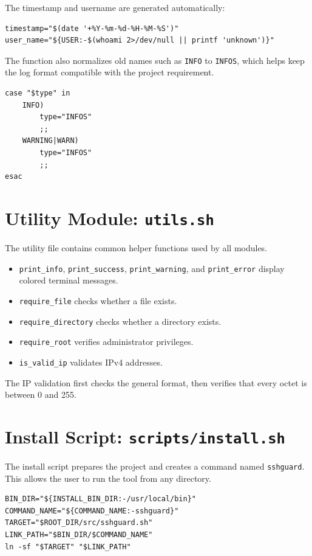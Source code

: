 \documentclass[12pt,a4paper]{article}
\begin{document}
The timestamp and username are generated automatically:

\begin{lstlisting}[style=bashstyle]
timestamp="$(date '+%Y-%m-%d-%H-%M-%S')"
user_name="${USER:-$(whoami 2>/dev/null || printf 'unknown')}"
\end{lstlisting}

The function also normalizes old names such as \texttt{INFO} to \texttt{INFOS}, which helps keep
the log format compatible with the project requirement.

\begin{lstlisting}[style=bashstyle]
case "$type" in
    INFO)
        type="INFOS"
        ;;
    WARNING|WARN)
        type="INFOS"
        ;;
esac
\end{lstlisting}

\section{Utility Module: \texttt{utils.sh}}

The utility file contains common helper functions used by all modules.

\begin{itemize}
    \item \texttt{print\_info}, \texttt{print\_success}, \texttt{print\_warning}, and \texttt{print\_error} display colored terminal messages.
    \item \texttt{require\_file} checks whether a file exists.
    \item \texttt{require\_directory} checks whether a directory exists.
    \item \texttt{require\_root} verifies administrator privileges.
    \item \texttt{is\_valid\_ip} validates IPv4 addresses.
\end{itemize}

The IP validation first checks the general format, then verifies that every octet is between
0 and 255.

\section{Install Script: \texttt{scripts/install.sh}}

The install script prepares the project and creates a command named \texttt{sshguard}.
This allows the user to run the tool from any directory.

\begin{lstlisting}[style=bashstyle]
BIN_DIR="${INSTALL_BIN_DIR:-/usr/local/bin}"
COMMAND_NAME="${COMMAND_NAME:-sshguard}"
TARGET="$ROOT_DIR/src/sshguard.sh"
LINK_PATH="$BIN_DIR/$COMMAND_NAME"
ln -sf "$TARGET" "$LINK_PATH"
\end{lstlisting}
\end{document}
